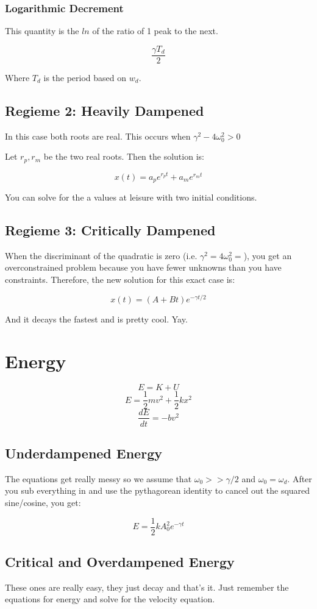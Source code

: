 \documentclass[a4paper,12pt]{report}
\begin{document}
\subsubsection{Logarithmic Decrement}
This quantity is the $ln$ of the ratio of 1 peak to the next.

$$\frac{\gamma T_d}{2}$$

Where $T_d$ is the period based on $w_d$.

\subsection{Regieme 2: Heavily Dampened}
In this case both roots are real. This occurs when $\gamma^2-4\omega_0^2 > 0$

Let $r_p, r_m$ be the two real roots. Then the solution is:

$$x(t) = a_pe^{r_pt} + a_me^{r_mt}$$

You can solve for the a values at leisure with two initial conditions.

\subsection{Regieme 3: Critically Dampened}
When the discriminant of the quadratic is zero (i.e. $\gamma^2 = 4\omega_0^2 = $), you
get an overconstrained problem because you have fewer unknowns than you have constraints.
Therefore, the new solution for this exact case is:

$$x(t) = (A + Bt)e^{-\gamma t/2}$$

And it decays the fastest and is pretty cool. Yay.

\section{Energy}
$$E = K + U$$
$$E = \frac{1}{2}mv^2 + \frac{1}{2}kx^2$$
$$\frac{dE}{dt} = -bv^2$$

\subsection{Underdampened Energy}
The equations get really messy so we assume that $\omega_0 >> \gamma/2$ and $\omega_0 = \omega_d$. After 
you sub everything in and use the pythagorean identity to cancel out the squared sine/cosine,
you get:

$$E = \frac{1}{2} kA_0^2e^{-\gamma t}$$

\subsection{Critical and Overdampened Energy}
These ones are really easy, they just decay and that's it. Just remember the equations for 
energy and solve for the velocity equation.
\end{document}
